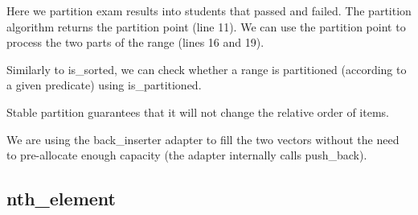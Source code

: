 Here we partition exam results into students that passed and failed. The partition algorithm returns the partition point (line 11). We can use the partition point to process the two parts of the range (lines 16 and 19).

Similarly to is\_sorted, we can check whether a range is partitioned (according to a given predicate) using is\_partitioned.



\begin{box-note}
\end{box-note}

Stable partition guarantees that it will not change the relative order of items.





\begin{box-note}
\end{box-note}

We are using the back\_inserter adapter to fill the two vectors without the need to pre-allocate enough capacity (the adapter internally calls push\_back).

\subsection{nth\_element}

